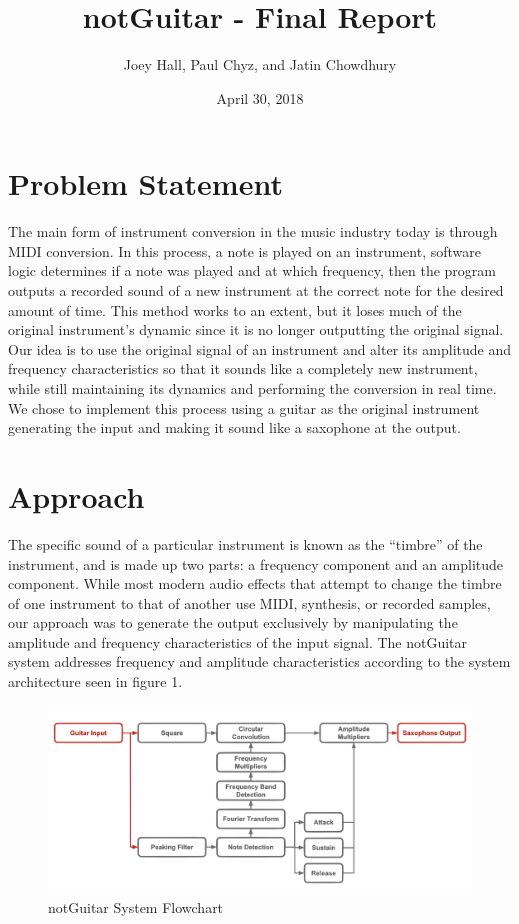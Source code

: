 \documentclass[12pt]{article}
\title{notGuitar - Final Report}
\author{Joey Hall, Paul Chyz, and Jatin Chowdhury}
\date{April 30, 2018}
\begin{document}
\maketitle
\section{Problem Statement}
The main form of instrument conversion in the music industry today is through MIDI conversion. In this process, a note is played on an instrument, software logic determines if a note was played and at which frequency, then the program outputs a recorded sound of a new instrument at the correct note for the desired amount of time. This method works to an extent, but it loses much of the original instrument's dynamic since it is no longer outputting the original signal. 
\newline\newline
Our idea is to use the original signal of an instrument and alter its amplitude and frequency characteristics so that it sounds like a completely new instrument, while still maintaining its dynamics and performing the conversion in real time. We chose to implement this process using a guitar as the original instrument generating the input and making it sound like a saxophone at the output. 

\section{Approach}
The specific sound of a particular instrument is known as the ``timbre'' of the instrument, and is made up two parts: a frequency component and an amplitude component. While most modern audio effects that attempt to change the timbre of one instrument to that of another use MIDI, synthesis, or recorded samples, our approach was to generate the output exclusively by manipulating the amplitude and frequency characteristics of the input signal. The notGuitar system addresses frequency and amplitude characteristics according to the system architecture seen in figure 1.

\begin{figure}[H]
\includegraphics[scale=0.28]{Pictures/FlowChart.png}
\centering
\caption{notGuitar System Flowchart}
\centering
\end{figure}
\end{document}
